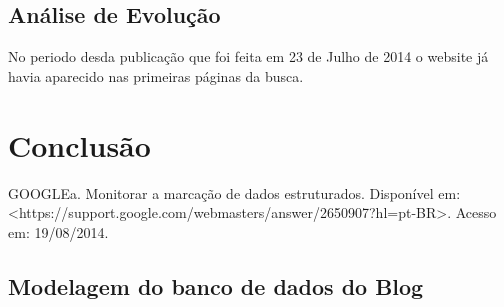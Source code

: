 \documentclass[
	12pt,				%
	openright,			%
	twoside,			%
	a4paper,			%
	english,			%
	french,				%
	spanish,			%
	brazil				%
	]{abntex2}
\begin{document}
\section{Análise de Evolução}

No periodo desda publicação que foi feita em 23 de Julho de 2014 o website já havia aparecido nas primeiras páginas da busca.



\chapter*[Conclusão]{Conclusão}


\postextual




GOOGLEa. Monitorar a marcação de dados estruturados. Disponível em: <https://support.google.com/webmasters/answer/2650907?hl=pt-BR>. Acesso  em: 19/08/2014.

%
%



\begin{anexosenv}

\partanexos

\chapter{Modelagem do banco de dados do Blog}


\end{anexosenv}

\printindex
\end{document}
